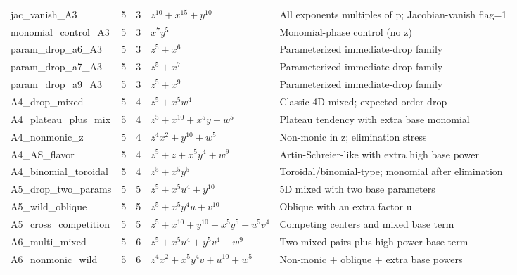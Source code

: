 \documentclass[11pt]{amsart}
\begin{document}
\begin{longtable}{@{}p{} r r p{} p{}@{}}
jac\_vanish\_A3 & 5 & 3 & $z^{10} + x^{15} + y^{10}$ & All exponents multiples of p; Jacobian-vanish flag=1 \\
monomial\_control\_A3 & 5 & 3 & $x^{7}y^{5}$ & Monomial-phase control (no z) \\
param\_drop\_a6\_A3 & 5 & 3 & $z^{5} + x^{6}$ & Parameterized immediate-drop family \\
param\_drop\_a7\_A3 & 5 & 3 & $z^{5} + x^{7}$ & Parameterized immediate-drop family \\
param\_drop\_a9\_A3 & 5 & 3 & $z^{5} + x^{9}$ & Parameterized immediate-drop family \\
A4\_drop\_mixed & 5 & 4 & $z^{5} + x^{5}w^{4}$ & Classic 4D mixed; expected order drop \\
A4\_plateau\_plus\_mix & 5 & 4 & $z^{5} + x^{10} + x^{5}y + w^{5}$ & Plateau tendency with extra base monomial \\
A4\_nonmonic\_z & 5 & 4 & $z^{4}x^{2} + y^{10} + w^{5}$ & Non-monic in z; elimination stress \\
A4\_AS\_flavor & 5 & 4 & $z^{5} + z + x^{5}y^{4} + w^{9}$ & Artin-Schreier-like with extra high base power \\
A4\_binomial\_toroidal & 5 & 4 & $z^{5} + x^{5}y^{5}$ & Toroidal/binomial-type; monomial after elimination \\
A5\_drop\_two\_params & 5 & 5 & $z^{5} + x^{5}u^{4} + y^{10}$ & 5D mixed with two base parameters \\
A5\_wild\_oblique & 5 & 5 & $z^{5} + x^{5}y^{4}u + v^{10}$ & Oblique with an extra factor u \\
A5\_cross\_competition & 5 & 5 & $z^{5} + x^{10} + y^{10} + x^{5}y^{5} + u^{5}v^{4}$ & Competing centers and mixed base term \\
A6\_multi\_mixed & 5 & 6 & $z^{5} + x^{5}u^{4} + y^{5}v^{4} + w^{9}$ & Two mixed pairs plus high-power base term \\
A6\_nonmonic\_wild & 5 & 6 & $z^{4}x^{2} + x^{5}y^{4}v + u^{10} + w^{5}$ & Non-monic + oblique + extra base powers \\
\bottomrule
\end{longtable}
\end{document}

